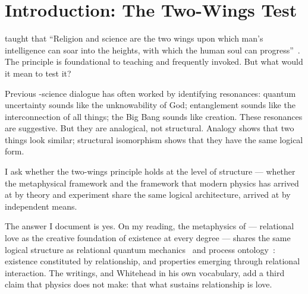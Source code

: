 
\section{Introduction: The Two-Wings Test}
\label{sec:intro}


\AbdulBaha taught that ``Religion and science are the two wings upon which
man's intelligence can soar into the heights, with which the human soul can
progress''~\citep[p.~143]{ParisTalks}.
The principle is foundational to \bahai teaching and frequently invoked.
But what would it mean to test it?

Previous \bahai-science dialogue has often worked by identifying resonances:
quantum uncertainty sounds like the unknowability of God; entanglement sounds
like the interconnection of all things; the Big Bang sounds like creation.
These resonances are suggestive.
But they are analogical, not structural.
Analogy shows that two things look similar; structural isomorphism shows that
they have the same logical form.

I ask whether the two-wings principle holds at the level
of structure --- whether the \bahai metaphysical framework and the framework
that modern physics has arrived at by theory and experiment share the same logical
architecture, arrived at by independent means.

The answer I document is yes.
On my reading, the \bahai metaphysics of \mahabbat --- relational love as the creative
foundation of existence at every degree --- shares the same logical structure
as relational quantum mechanics~\citep{Rovelli1996} and process
ontology~\citep{Whitehead1929}: existence constituted by relationship, and
properties emerging through relational interaction.
The writings, and Whitehead in his own vocabulary, add a third claim that
physics does not make: that what sustains relationship is love.

